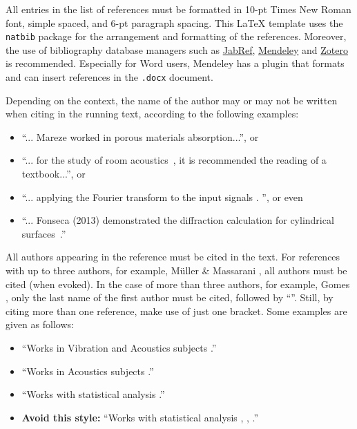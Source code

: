 \documentclass[12pt, a4paper, twoside, twocolumn]{article}
\begin{document}
All entries in the list of references must be formatted in 10-pt Times New Roman font, simple spaced, and 6-pt paragraph spacing. This \LaTeX\xspace template uses the \texttt{natbib} package for the arrangement and formatting of the references. Moreover, the use of bibliography database managers such as \href{http://www.jabref.org/}{JabRef}, \href{http://www.mendeley.com}{Mendeley} and \href{https://www.zotero.org/}{Zotero} is recommended. Especially for Word users, Mendeley has a plugin that formats and can insert references in the \texttt{.docx} document.

Depending on the context, the name of the author may or may not be written when citing in the running text, according to the following examples:

\begin{itemize}[noitemsep,topsep=0ex] \itemsep=4pt
	\item 	``... Mareze \etal \cite{Mareze-2019} worked in porous materials absorption...'', or
	\item ``... for the study of room acoustics~\cite{Brandao-2017}, it is recommended the reading of a textbook...'', or
	\item ``... applying the Fourier transform to the input signals \cite{Oppenheim-1996}. '', or even
	\item ``... Fonseca (2013) demonstrated the diffraction calculation for cylindrical surfaces~\cite{Fonseca-2013}.''
\end{itemize}

All authors appearing in the reference must be cited in the text. 
For references with up to three authors, for example,  Müller \& Massarani \cite{Muller-2001}, all authors must be cited (when evoked). In the case of more than three authors, for example, Gomes \etal \cite{Gomes-2015}, only the last name of the first author must be cited, followed by ``\etal''. Still, by citing more than one reference, make use of just one bracket. Some examples are given as follows:

\begin{itemize}[noitemsep,topsep=0ex] \itemsep=8pt
	\item ``Works in Vibration and Acoustics subjects \cite{Mareze-2017,Fonseca-2013,Brandao-2017}.''
	\item ``Works in Acoustics subjects \cite{Mareze-2017,Oppenheim-1996,Muller-2001,Mareze-2019}.''
	\item ``Works with statistical analysis \cite{Mareze-2017, Brandao-2017, Borges-2018}.''
	\item \textbf{Avoid this style:} ``Works with statistical analysis \cite{Mareze-2017}, \cite{Brandao-2017}, \cite{Ristow-2016}.''
\end{itemize}
\end{document}
